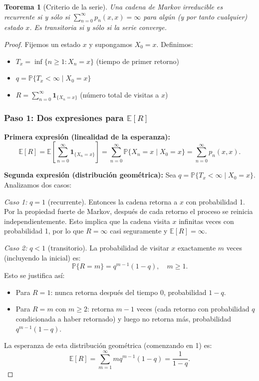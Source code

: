 \documentclass[11pt,a4paper]{article}
\theoremstyle{plain}
\newtheorem{teorema}{Teorema}[section]
\theoremstyle{definition}
\theoremstyle{remark}
\newcommand{\1}{\mathds{1}}
\begin{document}
\begin{teorema}[Criterio de la serie]
Una cadena de Markov irreducible es recurrente si y sólo si \(\sum_{n=0}^{\infty} p_n(x,x) = \infty\) para algún (y por tanto cualquier) estado \(x\). Es transitoria si y sólo si la serie converge.
\end{teorema}

\begin{proof}
Fijemos un estado \(x\) y supongamos \(X_0 = x\). Definimos:
\begin{itemize}
\item \(T_x = \inf\{n \geq 1: X_n = x\}\) (tiempo de primer retorno)
\item \(q = \mathbb{P}\{T_x < \infty \mid X_0 = x\}\)
\item \(R = \sum_{n=0}^{\infty} \mathbf{1}_{\{X_n = x\}}\) (número total de visitas a \(x\))
\end{itemize}

\subsubsection*{Paso 1: Dos expresiones para \(\mathbb{E}[R]\)}

\textbf{Primera expresión (linealidad de la esperanza):}
\[
\mathbb{E}[R] = \mathbb{E}\left[\sum_{n=0}^{\infty} \mathbf{1}_{\{X_n = x\}}\right] = \sum_{n=0}^{\infty} \mathbb{P}\{X_n = x \mid X_0 = x\} = \sum_{n=0}^{\infty} p_n(x,x).
\]

\textbf{Segunda expresión (distribución geométrica):} Sea \(q = \mathbb{P}\{T_x < \infty \mid X_0 = x\}\). Analizamos dos casos:

\emph{Caso 1:} \(q = 1\) (recurrente). Entonces la cadena retorna a \(x\) con probabilidad 1. Por la propiedad fuerte de Markov, después de cada retorno el proceso se reinicia independientemente. Esto implica que la cadena visita \(x\) infinitas veces con probabilidad 1, por lo que \(R = \infty\) casi seguramente y \(\mathbb{E}[R] = \infty\).

\emph{Caso 2:} \(q < 1\) (transitorio). La probabilidad de visitar \(x\) exactamente \(m\) veces (incluyendo la inicial) es:
\[
\mathbb{P}\{R = m\} = q^{m-1}(1-q), \quad m \geq 1.
\]
Esto se justifica así:
\begin{itemize}
\item Para \(R=1\): nunca retorna después del tiempo 0, probabilidad \(1-q\).
\item Para \(R=m\) con \(m \geq 2\): retorna \(m-1\) veces (cada retorno con probabilidad \(q\) condicionada a haber retornado) y luego no retorna más, probabilidad \(q^{m-1}(1-q)\).
\end{itemize}
La esperanza de esta distribución geométrica (comenzando en 1) es:
\[
\mathbb{E}[R] = \sum_{m=1}^{\infty} m q^{m-1}(1-q) = \frac{1}{1-q}.
\]


\end{proof}
\end{document}
